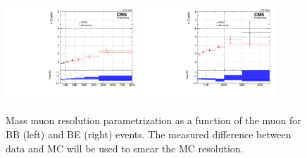 \begin{figure}[htbp]
\centering
\includegraphics[width=0.45\textwidth]{Images/Cap5/MassResolutionVsPt_BB.pdf}
\includegraphics[width=0.45\textwidth]{Images/Cap5/MassResolutionVsPt_BE.pdf}
\caption{Mass muon resolution parametrization as a function of the  muon \pt for BB (left) and BE (right) events. The measured difference between data and MC will be used to smear the MC resolution.}
\label{fig:ResolutionAtZpeak}
\end{figure}

